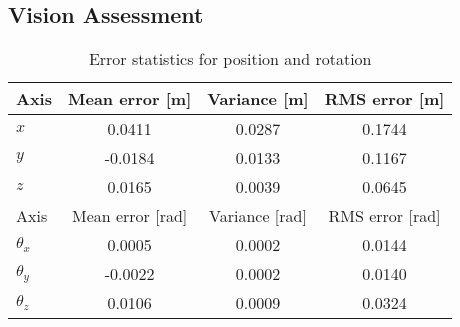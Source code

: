 \documentclass[bare_jrnl_transmag]{subfiles}
\begin{document}
\subsection{Vision Assessment}
\begin{table}[htbp]
    \centering
    \begin{tabular}{lccc}
    \hline
    Axis & Mean error [m] & Variance [m] & RMS error [m] \\ \hline
    $x$ & 0.0411 & 0.0287 & 0.1744 \\
    $y$ & -0.0184 & 0.0133 & 0.1167 \\
    $z$ & 0.0165 & 0.0039 & 0.0645 \\ \hline
    Axis & Mean error [rad] & Variance [rad] & RMS error [rad] \\ \hline
    $\theta_x$ & 0.0005 & 0.0002 & 0.0144 \\
    $\theta_y$ & -0.0022 & 0.0002 & 0.0140 \\
    $\theta_z$ & 0.0106 & 0.0009 & 0.0324 \\ \hline
    \end{tabular}
    \caption{Error statistics for position and rotation}
    \label{tab:error-stats}
    \end{table}
\end{document}
